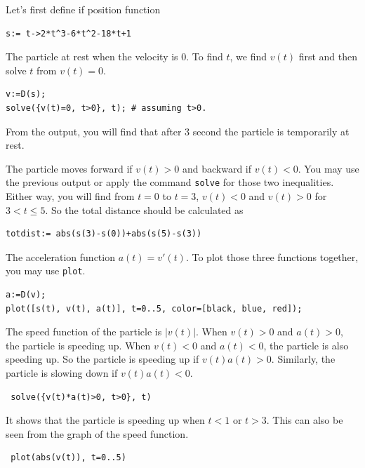 \documentclass[en,11pt,simple]{elegantbook}
\let\BeginKnitrBlock\begin \let\EndKnitrBlock\end
\begin{document}
\BeginKnitrBlock{solution}{}{}
{}
Let's first define if position function

\begin{verbatim}
s:= t->2*t^3-6*t^2-18*t+1
\end{verbatim}

The particle at rest when the velocity is 0. To find \(t\), we find \(v(t)\) first and then solve \(t\) from \(v(t)=0\).

\begin{verbatim}
v:=D(s);
solve({v(t)=0, t>0}, t); # assuming t>0.
\end{verbatim}

From the output, you will find that after 3 second the particle is temporarily at rest.

The particle moves forward if \(v(t)>0\) and backward if \(v(t)<0\). You may use the previous output or apply the command \texttt{solve} for those two inequalities. Either way, you will find from \(t=0\) to \(t=3\), \(v(t)<0\) and \(v(t)>0\) for \(3<t\le 5\). So the total distance should be calculated as

\begin{verbatim}
totdist:= abs(s(3)-s(0))+abs(s(5)-s(3))
\end{verbatim}

The acceleration function \(a(t)=v'(t)\). To plot those three functions together, you may use \texttt{plot}.

\begin{verbatim}
a:=D(v);
plot([s(t), v(t), a(t)], t=0..5, color=[black, blue, red]);
\end{verbatim}

The speed function of the particle is \(|v(t)|\). When \(v(t)>0\) and \(a(t)>0\), the particle is speeding up. When \(v(t)<0\) and \(a(t)<0\), the particle is also speeding up. So the particle is speeding up if \(v(t)a(t)>0\). Similarly, the particle is slowing down if \(v(t)a(t)<0\).

\begin{verbatim}
 solve({v(t)*a(t)>0, t>0}, t)
\end{verbatim}

It shows that the particle is speeding up when \(t<1\) or \(t>3\). This can also be seen from the graph of the speed function.

\begin{verbatim}
 plot(abs(v(t)), t=0..5)
\end{verbatim}
\EndKnitrBlock{solution}
\end{document}
